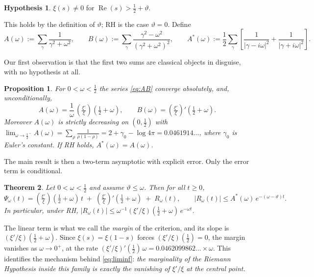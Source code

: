 \documentclass[11pt,reqno]{amsart}
\theoremstyle{plain}
\newtheorem{theorem}{Theorem}[section]
\newtheorem{proposition}[theorem]{Proposition}
\theoremstyle{definition}
\newtheorem{hypothesis}{Hypothesis}
\newcommand{\Rp}{\operatorname{Re}}
\newcommand{\lxi}[1]{\left(\tfrac{\xi'}{\xi}\right)\!#1}
\begin{document}
\begin{hypothesis}\label{hyp}
$\xi(s)\neq0$ for $\Rp(s)>\tfrac12+\vartheta$.
\end{hypothesis}

\noindent
This holds by the definition of $\vartheta$; RH is the case $\vartheta=0$. Define
\begin{equation}\label{eq:AB}
  A(\omega):=\sum_\gamma\frac{1}{\gamma^{2}+\omega^{2}},
  \qquad
  B(\omega):=\sum_\gamma\frac{\gamma^{2}-\omega^{2}}{(\gamma^{2}+\omega^{2})^{2}},
  \qquad
  A^{*}(\omega):=\frac12\sum_\gamma\left[\frac1{|\gamma-i\omega|^{2}}+\frac1{|\gamma+i\omega|^{2}}\right].
\end{equation}

Our first observation is that the first two sums are classical objects in disguise, with no
hypothesis at all.

\begin{proposition}\label{prop:AB}
For $0<\omega<\tfrac12$ the series \eqref{eq:AB} converge absolutely, and, unconditionally,
\[
  A(\omega)=\frac1\omega\,\lxi{\left(\tfrac12+\omega\right)},
  \qquad
  B(\omega)=\lxi{'\left(\tfrac12+\omega\right)} .
\]
Moreover $A(\omega)$ is strictly decreasing on $(0,\tfrac12)$ with
$\lim_{\omega\to\frac12^{-}}A(\omega)=\sum_\rho\frac{1}{\rho(1-\rho)}=2+\gamma_0-\log4\pi
=0.0461914\ldots$, where $\gamma_0$ is Euler's constant. If RH holds, $A^{*}(\omega)=A(\omega)$.
\end{proposition}

The main result is then a two-term asymptotic with explicit error. Only the error term is
conditional.

\begin{theorem}\label{thm:asym}
Let $0<\omega<\tfrac12$ and assume $\vartheta\le\omega$. Then for all $t\ge0$,
\[
  \Psi_\omega(t)=\lxi{\left(\tfrac12+\omega\right)}\,t
  \;+\;\lxi{'\left(\tfrac12+\omega\right)}
  \;+\;R_\omega(t),
  \qquad
  |R_\omega(t)|\le A^{*}(\omega)\,e^{-(\omega-\vartheta)t}.
\]
In particular, under RH, $|R_\omega(t)|\le \omega^{-1}(\xi'/\xi)(\tfrac12+\omega)\,e^{-\omega t}$.
\end{theorem}

The linear term is what we call the \emph{margin} of the criterion, and its slope is
$(\xi'/\xi)(\tfrac12+\omega)$. Since $\xi(s)=\xi(1-s)$ forces $(\xi'/\xi)(\tfrac12)=0$, the margin
vanishes as $\omega\to0^{+}$, at the rate $(\xi'/\xi)'(\tfrac12)\,\omega=0.0462099862\ldots\times\omega$.
This identifies the mechanism behind \eqref{eq:liminf}: \emph{the marginality of the Riemann
Hypothesis inside this family is exactly the vanishing of $\xi'/\xi$ at the central point.}
\end{document}
